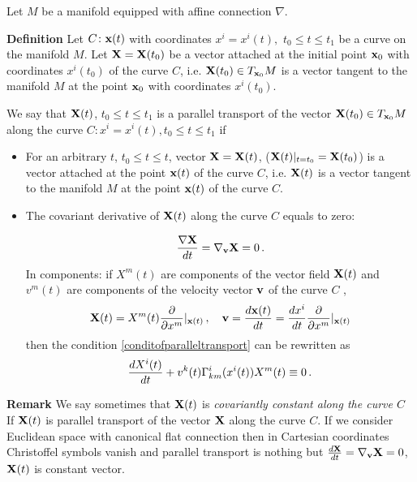 \documentclass[12pt]{article}
\theoremstyle{theorem}
\numberwithin{equation}{section}
\begin{document}
{   Let $M$ be a manifold equipped with affine connection $\nabla$.

   {\bf Definition} Let $C\colon {\bf x}(t)$ with coordinates
   $x^i=x^i(t),\,\, t_0\leq t\leq t_1$ be a curve on the manifold $M$.
   Let ${\bf X}={\bf X}(t_0)$ be a vector attached at the initial point
  ${\bf x}_0$ with coordinates $x^i(t_0)$ of the curve $C$, i.e.
  ${\bf X}(t_0)\in T_{{\bf x}_0}M$ is a vector tangent to the manifold $M$
  at the point ${\bf x}_0$ with coordinates $x^i(t_0)$.

  We say that ${\bf X}(t)$, $t_0\leq t\leq t_1$ is a parallel transport of the
  vector ${\bf X}(t_0)\in T_{{\bf x}_0}M$ along the curve $C\colon x^i=x^i(t), t_0\leq t\leq t_1$ if

\begin {itemize}

\item For an arbitrary $t$, $t_0\leq t\leq t$, vector ${\bf X}={\bf X}(t)$, (${\bf X}(t)\vert_{t=t_0}={\bf X}(t_0)$)
 is a vector attached at the point
  ${\bf x}(t)$ of the curve $C$,
 i.e. ${\bf X}(t)$ is a vector tangent to the manifold $M$
  at the point ${\bf x}(t)$  of the curve $C$.

  \item The covariant derivative of ${\bf X}(t)$ along the curve $C$ equals to zero:

  \begin{equation}\label{conditofparalleltransport}
    {\nabla {\bf X}\over dt}=\nabla_{\bf v} {\bf X}=0\,.
  \end{equation}
 In components: if $X^m(t)$ are components of the vector field ${\bf X}(t)$
 and   $v^m(t)$ are components of the velocity vector ${\bf v}$ of the curve  $C$ ,
                $$
                {\bf X}(t)=X^m(t){\partial \over \partial x^m}\vert_{{\bf x}(t)}\,,\quad
                {\bf v}={d{\bf x}(t)\over dt}={dx^i\over dt}{\partial \over \partial x^m}\vert_{{\bf x}(t)}
                $$
  then the condition \eqref{conditofparalleltransport} can be rewritten as
  \begin{equation}\label{conditofparalleltransportcomponents}
    {dX^i(t)\over dt}+v^k(t)\Gamma^i_{km}(x^i(t))X^m(t)\equiv 0\,.
  \end{equation}


\end{itemize}

\m

{\bf Remark}    We say sometimes that ${\bf X}(t)$ is {\it covariantly constant along the curve $C$}
   If ${\bf X}(t)$ is parallel transport of the vector ${\bf X}$ along the curve $C$.
  If we consider Euclidean space with canonical flat connection then in Cartesian coordinates
  Christoffel symbols vanish and parallel transport is nothing but
   ${d {\bf X}\over dt}=\nabla_{\bf v} {\bf X}=0$, ${\bf X}(t)$ is constant vector.



}
\end{document}
